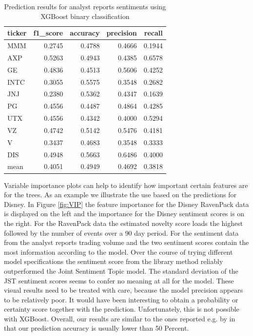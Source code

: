 \begin{table}[h]
\centering
\footnotesize
\begin{tabular}{lrrrr}
\toprule
ticker &  f1\_score &  accuracy &  precision &    recall \\
\midrule
MMM    &  0.2745 &  0.4788 &   0.4666 &  0.1944 \\
AXP    &  0.5263 &  0.4943 &   0.4385 &  0.6578 \\
GE     &  0.4836 &  0.4513 &   0.5606 &  0.4252 \\
INTC   &  0.3055 &  0.5575 &   0.3548 &  0.2682 \\
JNJ    &  0.2380 &  0.5362 &   0.4347 &  0.1639 \\
PG     &  0.4556 &  0.4487 &   0.4864 &  0.4285 \\
UTX    &  0.4556 &  0.4342 &   0.4000 &  0.5294 \\
VZ     &  0.4742 &  0.5142 &   0.5476 &  0.4181 \\
V      &  0.3437 &  0.4683 &   0.3548 &  0.3333 \\
DIS    &  0.4948 &  0.5663 &   0.6486 &  0.4000 \\
\midrule
mean &  0.4051 & 0.4949 & 0.4692 & 0.3818 \\
\bottomrule
\end{tabular}
    \caption{Prediction results for analyst reports sentiments using XGBoost binary classification}
    \label{tab:OurSentRes}
\end{table}
Variable importance plots can help to identify how important certain features are for the trees. As an example we illustrate the use based on the predictions for Disney. In Figure \ref{fig:VIP} the feature importance for the Disney RavenPack data is displayed on the left and the importance for the Disney sentiment scores is on the right. For the RavenPack data the estimated novelty score loads the highest followed by the number of events over a 90 day period. For the sentiment data from the analyst reports trading volume and the two sentiment scores contain the most information according to the model. Over the course of trying different model specifications the sentiment score from the library method reliably outperformed the Joint Sentiment Topic model. The standard deviation of the JST sentiment scores seems to confer no meaning at all for the model. These visual results need to be treated with care, because the model precision appears to be relatively poor. It would have been interesting to obtain a probability or certainty score together with the prediction. Unfortunately, this is not possible with XGBoost. Overall, our results are similar to the ones reported e.g. by \citet{atkins2018financial} in that our prediction accuracy is usually lower than 50 Percent. 

